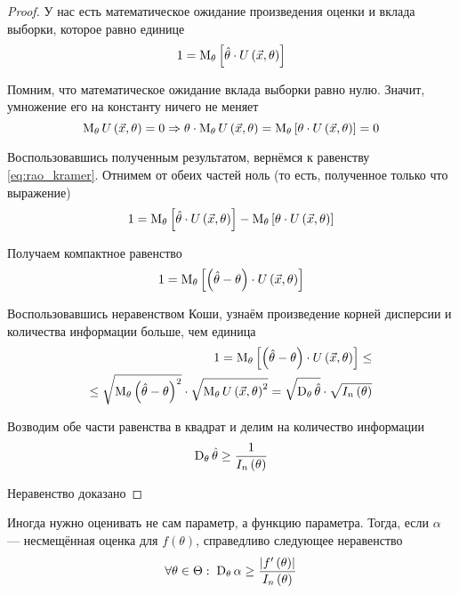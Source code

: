 \begin{proof}
  У нас есть математическое ожидание произведения оценки и вклада выборки,
  которое равно единице
  \begin{equation}\label{eq:rao_kramer}
    1 = \operatorname{M}_{\theta} \left[ \hat{\theta}\cdot U\left( \vec{x},\theta \right) \right]
  \end{equation}

  Помним, что математическое ожидание вклада выборки равно нулю.
  Значит, умножение его на константу ничего не меняет
  $$\operatorname{M}_{\theta} U\left( \vec{x},\theta \right)=0
    \Rightarrow 
    \theta\cdot\operatorname{M}_{\theta} U\left( \vec{x},\theta \right)
    = \operatorname{M}_{\theta} \left[ \theta\cdot U\left(\vec{x},\theta\right) \right]
    = 0$$

  Воспользовавшись полученным результатом,
  вернёмся к равенству \eqref{eq:rao_kramer}.
  Отнимем от обеих частей ноль (то есть, полученное только что выражение)
  $$1 = \operatorname{M}_{\theta} \left[ \hat{\theta}\cdot U\left( \vec{x},\theta \right) \right]
    - \operatorname{M}_{\theta} \left[ \theta\cdot U\left(\vec{x},\theta\right) \right]$$

  Получаем компактное равенство
  $$1 = \operatorname{M}_{\theta} \left[ \left(\hat{\theta}-\theta\right)
    \cdot U\left( \vec{x},\theta \right) \right]$$

  Воспользовавшись неравенством Коши, узнаём
  произведение корней дисперсии и количества информации больше, чем единица
  \begin{equation}\label{eq:rao_kramer_koshi}
    \begin{split}
    1 = \operatorname{M}_{\theta} 
      \left[\left(\hat{\theta}-\theta\right)
        \cdot U\left( \vec{x},\theta \right)\right] \le \\
    \le \sqrt{\operatorname{M}_{\theta} 
      \left(\hat{\theta}-\theta\right)^2}
      \cdot\sqrt{\operatorname{M}_{\theta} U\left( \vec{x},\theta \right)^2}
    = \sqrt{\operatorname{D}_{\theta} \hat{\theta}}
      \cdot\sqrt{I_n\left(\theta\right)}
    \end{split}
  \end{equation}

  Возводим обе части равенства в квадрат и делим на количество информации
  $$\operatorname{D}_{\theta} \hat{\theta}\ge \frac{1}{I_n\left(\theta\right)}$$

  Неравенство доказано
\end{proof}
\begin{remark}
  Иногда нужно оценивать не сам параметр, а функцию параметра.
  Тогда, если $\alpha$ --- несмещённая оценка для $f\left(\theta\right)$,
  справедливо следующее неравенство
  $$\forall\theta\in\Theta:\;\operatorname{D}_{\theta} \alpha
    \ge\frac{\left|f'\left(\theta\right)\right|}{I_n\left(\theta\right)}$$
\end{remark}

